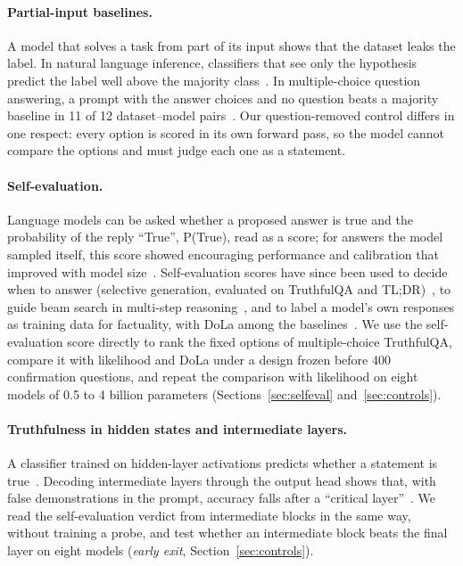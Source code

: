 \documentclass[11pt]{article}
\begin{document}
\paragraph{Partial-input baselines.}
A model that solves a task from part of its input shows that the dataset leaks the label. In natural language
inference, classifiers that see only the hypothesis predict the label well above the majority
class~\citep{gururangan2018annotation,poliak2018hypothesis}. In multiple-choice question answering, a prompt with
the answer choices and no question beats a majority baseline in 11 of 12 dataset--model
pairs~\citep{balepur2024artifacts}. Our question-removed control differs in one respect: every option is scored in
its own forward pass, so the model cannot compare the options and must judge each one as a statement.

\paragraph{Self-evaluation.}
Language models can be asked whether a proposed answer is true and the probability of the reply ``True'',
P(True), read as a score; for answers the model sampled itself, this score showed encouraging performance and
calibration that improved with model size~\citep{kadavath2022language}. Self-evaluation scores have since been used to decide when to answer
(selective generation, evaluated on TruthfulQA and TL;DR)~\citep{ren2023selfevaluation}, to guide beam search in
multi-step reasoning~\citep{xie2023selfevaluation}, and to label a model's own responses as training data for
factuality, with DoLa among the baselines~\citep{zhang2024selfalignment}. We use the self-evaluation score directly to
rank the fixed options of multiple-choice TruthfulQA, compare it with likelihood and DoLa under a design frozen
before 400 confirmation questions, and repeat the comparison with likelihood on eight models of 0.5 to 4 billion
parameters (Sections~\ref{sec:selfeval} and~\ref{sec:controls}).

\paragraph{Truthfulness in hidden states and intermediate layers.}
A classifier trained on hidden-layer activations predicts whether a statement is true~\citep{azaria2023internal}.
Decoding intermediate layers through the output head shows that, with false demonstrations in the prompt, accuracy
falls after a ``critical layer''~\citep{halawi2024overthinking}. We read the self-evaluation verdict from
intermediate blocks in the same way, without training a probe, and test whether an intermediate block beats the
final layer on eight models (\emph{early exit}, Section~\ref{sec:controls}).
\end{document}
